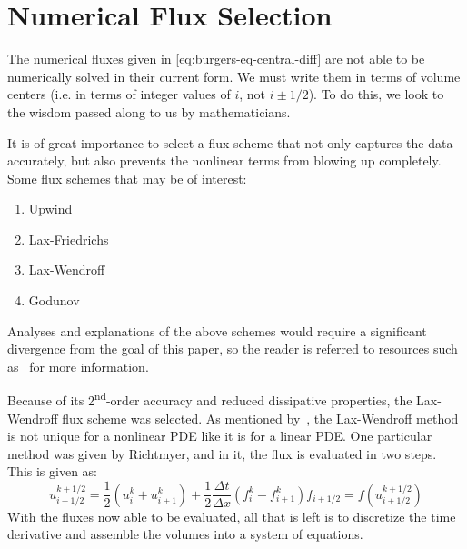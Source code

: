 \documentclass[11pt, letterpaper]{article}
\numberwithin{equation}{section}
\begin{document}
	\section{Numerical Flux Selection} \label{sec:numerical-flux-selection}
	The numerical fluxes given in \cref{eq:burgers-eq-central-diff} are not able to be numerically solved in their current form.
	We must write them in terms of volume centers (i.e. in terms of integer values of $i$, not $i\pm 1/2$).
	To do this, we look to the wisdom passed along to us by mathematicians.

	It is of great importance to select a flux scheme that not only captures the data accurately, but also prevents the nonlinear terms from blowing up completely.
	Some flux schemes that may be of interest:
	\begin{enumerate}
		\item Upwind
		\item Lax-Friedrichs
		\item Lax-Wendroff
		\item Godunov
	\end{enumerate}
	Analyses and explanations of the above schemes would require a significant divergence from the goal of this paper, so the reader is referred to resources such as~\cite{alma992854184708136} for more information.

	Because of its 2\textsuperscript{nd}-order accuracy and reduced dissipative properties, the Lax-Wendroff flux scheme was selected.
	As mentioned by~\cite{LaxWendroffMethodEncyclopedia}, the Lax-Wendroff method is not unique for a nonlinear PDE like it is for a linear PDE.
	One particular method was given by Richtmyer, and in it, the flux is evaluated in two steps.
	This is given as:
	\begin{subequations}
		\begin{equation}
			\label{eq:richtmyer-1st-step}
			u_{i+1/2}^{k+1/2}=\frac{1}{2}\left( u_i^k+u_{i+1}^k \right)+\frac{1}{2}\frac{\Delta t}{\Delta x}\left( f_i^k-f_{i+1}^k \right)
		\end{equation}
		\begin{equation}
			\label{eq:richtmyer-2nd-step}
			f_{i+1/2}=f\left( u_{i+1/2}^{k+1/2} \right)
		\end{equation}
	\end{subequations}
	With the fluxes now able to be evaluated, all that is left is to discretize the time derivative and assemble the volumes into a system of equations.
\end{document}

